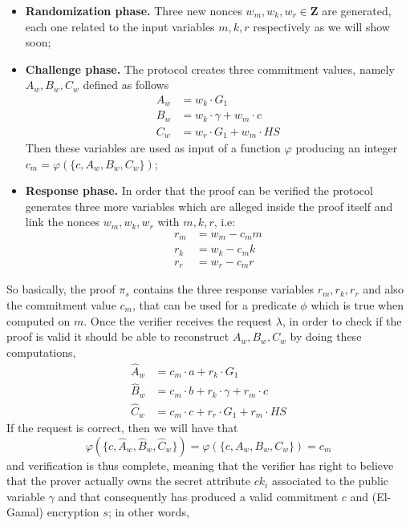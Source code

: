 \documentclass[twocolumn]{article}
\begin{document}
\begin{itemize}
    \item \textbf{Randomization phase.} Three new nonces $w_m, w_k, w_r\in \mathbf{Z}$ are generated, each one related to the input variables $m, k, r$ respectively as we will show soon; 
    \item \textbf{Challenge phase.} The protocol creates three commitment values, namely $A_w, B_w, C_w$ defined as follows
    \begin{align*}
        A_w &= w_k\cdot G_1 \\ 
        B_w &= w_k\cdot\gamma + w_m\cdot c \\
        C_w &= w_r\cdot G_1 + w_m \cdot HS
    \end{align*}
    Then these variables are used as input of a function $\varphi$ producing an integer $c_m=\varphi(\{c,A_w,B_w,C_w\})$;
    \item \textbf{Response phase.} In order that the proof can be verified the protocol generates three more variables which are alleged inside the proof itself and link the nonces $w_m, w_k, w_r$ with $m, k, r$, i.e:
    \begin{align*}
        r_m &= w_m - c_m m \\
        r_k &= w_k - c_m k \\
        r_r &= w_r - c_m r
    \end{align*}
\end{itemize}
So basically, the proof $\pi_s$ contains the three response variables $r_m, r_k, r_r$ and also the commitment value $c_m$, that can be used for a predicate $\phi$ which is true when computed on $m$. Once the verifier receives the request $\lambda$, in order to check if the proof is valid it should be able to reconstruct  $A_w, B_w, C_w$ by doing these computations,
\begin{align*}
\widehat{A}_w &= c_m\cdot a + r_k\cdot G_1 \\
\widehat{B}_w &= c_m\cdot b + r_k\cdot \gamma + r_m\cdot c \\
\widehat{C}_w &= c_m\cdot c + r_r\cdot G_1 + r_m\cdot HS
\end{align*}
If the request is correct, then we will have that 
\begin{equation}\label{challenge pi_s}
\varphi(\{c,\widehat{A}_w,\widehat{B}_w,\widehat{C}_w\}) = \varphi(\{c,A_w,B_w,C_w\}) = c_m
\end{equation}
and verification is thus complete, meaning that the verifier has right to believe that the prover actually owns the secret attribute $ck_i$ associated to the public variable $\gamma$ and that consequently has produced a valid commitment $c$ and (El-Gamal) encryption $s$; in other words,
\end{document}
